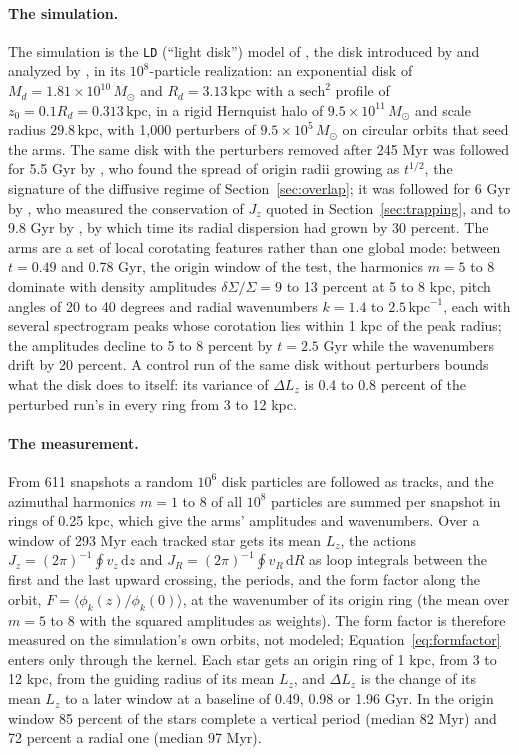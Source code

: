\documentclass[twocolumn]{aastex701}
\newcommand{\Jz}{J_z}
\newcommand{\Lz}{L_z}
\newcommand{\JR}{J_R}
\newcommand{\kpc}{\,\mathrm{kpc}}
\begin{document}
\paragraph{The simulation.} The simulation is the \texttt{LD} (``light disk'') model of
\citet{VeraCiro2016imprint}, the disk introduced by \citet{DOnghia2013} and analyzed
by \citet{VeraCiro2014}, in its $10^8$-particle realization: an exponential disk of
$M_d=1.81\times10^{10}\,M_\odot$ and $R_d=3.13\kpc$ with a $\mathrm{sech}^2$ profile of
$z_0=0.1R_d=0.313\kpc$, in a rigid Hernquist halo of $9.5\times10^{11}\,M_\odot$ and
scale radius $29.8\kpc$, with 1,000 perturbers of $9.5\times10^5\,M_\odot$ on circular
orbits that seed the arms. The same disk with the perturbers removed after 245 Myr was followed for
5.5 Gyr by \citet{VeraCiro2014}, who found the spread of origin radii growing as
$t^{1/2}$, the signature of the diffusive regime of Section~\ref{sec:overlap}; it was
followed for 6 Gyr by \citet{VeraCiro2016conservation}, who measured the conservation
of $\Jz$ quoted in Section~\ref{sec:trapping}, and to 9.8 Gyr by
\citet{VeraCiro2016imprint}, by which time its radial dispersion had grown by 30
percent. The arms are a set of
local corotating features rather than one global mode: between $t=0.49$ and 0.78 Gyr,
the origin window of the test, the harmonics $m=5$ to 8 dominate with density
amplitudes $\delta\Sigma/\Sigma=9$ to 13 percent at 5 to 8 kpc, pitch angles of 20 to
40 degrees and radial wavenumbers $k=1.4$ to $2.5\kpc^{-1}$, each with several
spectrogram peaks whose corotation lies within 1 kpc of the peak radius; the amplitudes
decline to 5 to 8 percent by $t=2.5$ Gyr while the wavenumbers drift by 20 percent. A
control run of the same disk without perturbers bounds what the disk does to itself:
its variance of $\Delta\Lz$ is 0.4 to 0.8 percent of the perturbed run's in every ring
from 3 to 12 kpc.

\paragraph{The measurement.} From 611 snapshots a random $10^6$ disk particles are
followed as tracks, and the azimuthal harmonics $m=1$ to 8 of all $10^8$ particles are
summed per snapshot in rings of 0.25 kpc, which give the arms' amplitudes and
wavenumbers. Over a window of 293 Myr each tracked star gets its mean $\Lz$, the actions
$\Jz=(2\pi)^{-1}\oint v_z\,\mathrm{d}z$ and $\JR=(2\pi)^{-1}\oint v_R\,\mathrm{d}R$
as loop integrals between the first and the last upward crossing, the periods, and the
form factor along the orbit, $F=\langle\phi_k(z)/\phi_k(0)\rangle$, at the wavenumber
of its origin ring (the mean over $m=5$ to 8 with the squared amplitudes as weights).
The form factor is therefore measured on the simulation's own orbits, not modeled;
Equation~\eqref{eq:formfactor} enters only through the kernel. Each star gets an
origin ring of 1 kpc, from 3 to 12 kpc, from the guiding radius of its mean $\Lz$, and
$\Delta\Lz$ is the change of its mean $\Lz$ to a later window at a baseline of 0.49,
0.98 or 1.96 Gyr. In the origin window 85 percent of the stars complete a vertical
period (median 82 Myr) and 72 percent a radial one (median 97 Myr).
\end{document}
